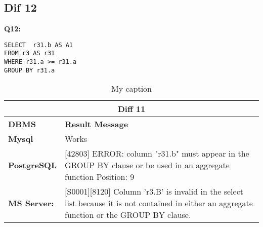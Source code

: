 \subsection{Dif 12}
 
\begin{mdframed}[backgroundcolor=lightgray!20] 
\textbf{Q12:}
\begin{lstlisting}
SELECT  r31.b AS A1
FROM r3 AS r31
WHERE r31.a >= r31.a
GROUP BY r31.a
\end{lstlisting}
\end{mdframed} 
 
\begin{table}[h]
\centering
\caption{My caption}
\label{my-label}
\begin{tabular}{|p{2cm}|p{12cm}|}
\hline
\multicolumn{2}{|c|}{\textbf{Diff 11}}                                                                                                                                                                                                                                                                                               \\ \hline
\textbf{DBMS}                              & \textbf{Result Message}                                                                                                                                                                                                                                                                 \\ \hline
{\color[HTML]{333333} \textbf{Mysql}}      & {\color[HTML]{333333} Works}                                                                                                                                                                                                                                                            \\ \hline
{\color[HTML]{333333} \textbf{PostgreSQL}} & {\color[HTML]{333333} {[}42803{]} ERROR: column "r31.b" must appear in the GROUP BY clause or be used in an aggregate function Position: 9}                                                                                                                                             \\ \hline
{\color[HTML]{333333} \textbf{MS Server:}} & {\color[HTML]{333333} {[}S0001{]}{[}8120{]} Column 'r3.B' is invalid in the select list because it is not contained in either an aggregate function or the GROUP BY clause.}                                                                                                            \\ \hline

\end{tabular}
\end{table}
